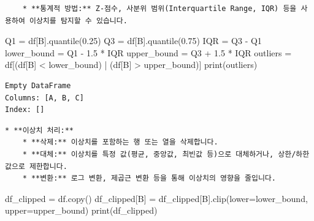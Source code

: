 \documentclass[
  letterpaper,
]{book}
\newenvironment{Shaded}{\begin{snugshade}}{\end{snugshade}}
\newcommand{\BuiltInTok}[1]{\textcolor[rgb]{0.00,0.23,0.31}{#1}}
\newcommand{\FloatTok}[1]{\textcolor[rgb]{0.68,0.00,0.00}{#1}}
\newcommand{\NormalTok}[1]{\textcolor[rgb]{0.00,0.23,0.31}{#1}}
\newcommand{\OperatorTok}[1]{\textcolor[rgb]{0.37,0.37,0.37}{#1}}
\newcommand{\StringTok}[1]{\textcolor[rgb]{0.13,0.47,0.30}{#1}}
\begin{document}
\begin{verbatim}
    * **통계적 방법:** Z-점수, 사분위 범위(Interquartile Range, IQR) 등을 사용하여 이상치를 탐지할 수 있습니다.
\end{verbatim}

\begin{Shaded}
\begin{Highlighting}[]
\NormalTok{    Q1 }\OperatorTok{=}\NormalTok{ df[}\StringTok{\textquotesingle{}B\textquotesingle{}}\NormalTok{].quantile(}\FloatTok{0.25}\NormalTok{)}
\NormalTok{    Q3 }\OperatorTok{=}\NormalTok{ df[}\StringTok{\textquotesingle{}B\textquotesingle{}}\NormalTok{].quantile(}\FloatTok{0.75}\NormalTok{)}
\NormalTok{    IQR }\OperatorTok{=}\NormalTok{ Q3 }\OperatorTok{{-}}\NormalTok{ Q1}
\NormalTok{    lower\_bound }\OperatorTok{=}\NormalTok{ Q1 }\OperatorTok{{-}} \FloatTok{1.5} \OperatorTok{*}\NormalTok{ IQR}
\NormalTok{    upper\_bound }\OperatorTok{=}\NormalTok{ Q3 }\OperatorTok{+} \FloatTok{1.5} \OperatorTok{*}\NormalTok{ IQR}
\NormalTok{    outliers }\OperatorTok{=}\NormalTok{ df[(df[}\StringTok{\textquotesingle{}B\textquotesingle{}}\NormalTok{] }\OperatorTok{\textless{}}\NormalTok{ lower\_bound) }\OperatorTok{|}\NormalTok{ (df[}\StringTok{\textquotesingle{}B\textquotesingle{}}\NormalTok{] }\OperatorTok{\textgreater{}}\NormalTok{ upper\_bound)]}
    \BuiltInTok{print}\NormalTok{(outliers)}
\end{Highlighting}
\end{Shaded}

\begin{verbatim}
Empty DataFrame
Columns: [A, B, C]
Index: []
\end{verbatim}

\begin{verbatim}
* **이상치 처리:**
    * **삭제:** 이상치를 포함하는 행 또는 열을 삭제합니다.
    * **대체:** 이상치를 특정 값(평균, 중앙값, 최빈값 등)으로 대체하거나, 상한/하한 값으로 제한합니다.
    * **변환:** 로그 변환, 제곱근 변환 등을 통해 이상치의 영향을 줄입니다.
\end{verbatim}

\begin{Shaded}
\begin{Highlighting}[]
\NormalTok{    df\_clipped }\OperatorTok{=}\NormalTok{ df.copy()}
\NormalTok{    df\_clipped[}\StringTok{\textquotesingle{}B\textquotesingle{}}\NormalTok{] }\OperatorTok{=}\NormalTok{ df\_clipped[}\StringTok{\textquotesingle{}B\textquotesingle{}}\NormalTok{].clip(lower}\OperatorTok{=}\NormalTok{lower\_bound, upper}\OperatorTok{=}\NormalTok{upper\_bound)}
    \BuiltInTok{print}\NormalTok{(df\_clipped)}
\end{Highlighting}
\end{Shaded}
\end{document}
